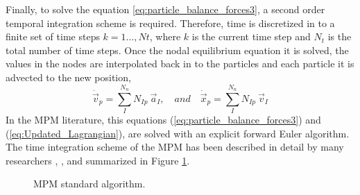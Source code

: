 Finally, to solve the equation \eqref{eq:particle_balance_forces3}, a second order
temporal integration scheme is required. Therefore, time is
discretized in to a finite set of time steps $k = 1\ldots ,Nt$, where $k$ is the current time step and $N_t$
is the total number of time steps. Once the nodal equilibrium equation it is solved, the values in the nodes are
interpolated back in to the particles and each particle it is advected
to the new position,
\begin{equation}
  \label{eq:Updated_Lagrangian}
  \dot{\vec{v}}_p = \sum^{N_n}_{I}N_{Ip}\ \vec{a}_{I},\quad and\quad
  \dot{\vec{x}}_{p} = \sum^{N_n}_{I}N_{Ip}\ \vec{v}_{I}  
\end{equation}
In the MPM literature, this equations
(\ref{eq:particle_balance_forces3}) and (\ref{eq:Updated_Lagrangian}),
are solved with an explicit forward Euler algorithm. The time integration scheme of the MPM has been described in detail by many researchers
\cite{Sulsky1994}, \cite{Bardenhagen2002}, \cite{thesis_Andersen_2009} and summarized
in Figure \ref{fig:MPM_algorithm}.

\begin{figure}\sidecaption
  \centering
  \caption{MPM standard algorithm.}
  \label{fig:MPM_algorithm}
\end{figure}

